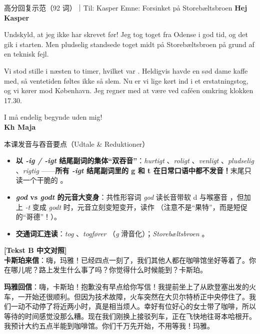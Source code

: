\begin{emailbox}{高分回复示范（92 词）｜Til: Kasper \quad Emne: Forsinket på Storebæltsbroen}
\textbf{Hej Kasper}

Undskyld, at jeg ikke har skrevet før! Jeg tog toget fra Odense i god tid, og det gik  i starten. Men pludselig standsede toget midt på Storebæltsbroen på grund af en teknisk fejl.

Vi stod stille i næsten to timer, hvilket var . Heldigvis havde en sød dame kaffe med, så ventetiden føltes ikke så slem. Nu er vi lige kørt ind i et erstatningstog, og vi kører  mod København. Jeg regner med at være ved caféen omkring klokken 17.30.

I må endelig begynde uden mig!\\
\textbf{Kh Maja}
\end{emailbox}

\begin{tipbox}{本课发音与吞音要点（Udtale \& Reduktioner）}
\begin{itemize}
  \item \textbf{以 \textit{-ig / -igt} 结尾副词的集体“双吞音”}：\textit{hurtigt} 、\textit{roligt} 、\textit{venligt} 、\textit{pludselig} 、\textit{rigtig} ——\textbf{所有 \textit{-igt} 结尾副词里的 g 和 t 在日常口语中都不发音！}末尾只读一个干脆的 。
  \item \textbf{\textit{god} vs \textit{godt} 的元音大变身}：共性形容词 \textit{god} 读长音带软 d 与喉塞音 ，但加上 \textit{-t} 变成 \textit{godt} 时，元音立刻变短变开，读作 （注意不是“果特”，而是短促的“哥德”！）。
  \item \textbf{交通词汇连读}：\textit{tog} 、\textit{togfører} （\textit{g} 滑音化）；\textit{Storebæltsbroen} 。
\end{itemize}
\end{tipbox}

\begin{transbox}
\small
\textbf{\color{NCDTeal}[Tekst B 中文对照]}\\
\textbf{卡斯珀来信}：嗨，玛雅！已经四点一刻了，我们其他人都在咖啡馆坐好等着了。你在哪儿呢？路上发生什么事了吗？你觉得什么时候能到？卡斯珀。

\textbf{玛雅回信}：嗨，卡斯珀！抱歉没有早点给你写信！我提前坐上了从欧登塞出发的火车，一开始还很顺利。但因为技术故障，火车突然在大贝尔特桥正中央停住了。我们一动不动停了将近两小时，真是相当烦人。幸好有位好心的女士带了咖啡，所以等待的时间感觉没那么糟。现在我们刚换上接驳列车，正在飞快地往哥本哈根开。我预计大约五点半能到咖啡馆。你们千万先开始，不用等我！玛雅。
\end{transbox}

